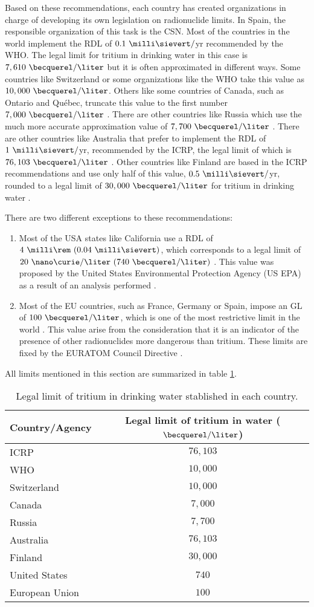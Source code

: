 Based on these recommendations, each country has created organizations in charge of developing its own legislation on radionuclide limits. In Spain, the responsible organization of this task is the CSN. Most of the countries in the world implement the RDL of $0.1~\milli\sievert/$yr recommended by the WHO. The legal limit for tritium in drinking water in this case is $7,610~\becquerel/\liter$  but it is often approximated in different ways. Some countries like Switzerland \cite{Switzerland_GL} or some organizations like the WHO \cite{WHO_GL} take this value as $10,000~\becquerel/\liter$. Others like some countries of Canada, such as Ontario and Québec, truncate this value to the first number $7,000~\becquerel/\liter$ \cite{Ontario_GL, Quebec_GL}. There are other countries like Russia which use the much more accurate approximation value of $7,700~\becquerel/\liter$ \cite{Russia_GL}. There are other countries like Australia that prefer to implement the RDL of $1~\milli\sievert/$yr, recommended by the ICRP, the legal limit of which is $76,103~\becquerel/\liter$ \cite{Australia_GL}. Other countries like Finland are based in the ICRP recommendations and use only half of this value, $0.5~\milli\sievert/$yr, rounded to a legal limit of $30,000~\becquerel/\liter$ for tritium in drinking water \cite{Finland_GL}.

There are two different exceptions to these recommendations:
\begin{enumerate}
\item{} Most of the USA states like California use a RDL of $4~\milli\rem~(0.04~\milli\sievert)$, which corresponds to a legal limit of $20~\nano\curie/\liter~(740~\becquerel/\liter)$ \cite{California_GL}. This value was proposed by the United States Environmental Protection Agency (US EPA) as a result of an analysis performed \cite{USEPA_GL}.

\item{} Most of the EU countries, such as France, Germany or Spain, impose an GL of $100~\becquerel/\liter$, which is one of the most restrictive limit in the world \cite{France_GL, Germany_GL, Spain_GL}. This value arise from the consideration that it is an indicator of the presence of other radionuclides more dangerous than tritium. These limits are fixed by the EURATOM Council Directive \cite{EURATOM_GL}. 
\end{enumerate}

All limits mentioned in this section are summarized in table \ref{tab:LegalLimitTritium}.

\begin{table}[htbp]
\centering{}%
\begin{tabular}{lc}
\toprule 
Country/Agency & Legal limit of tritium in water ($\becquerel/\liter$) \tabularnewline
\midrule
\midrule 
ICRP & $76,103$ \tabularnewline
WHO & $10,000$ \tabularnewline
Switzerland & $10,000$ \tabularnewline
Canada & $7,000$ \tabularnewline
Russia & $7,700$ \tabularnewline
Australia & $76,103$ \tabularnewline
Finland & $30,000$ \tabularnewline
United States & $740$ \tabularnewline
European Union & $100$ \tabularnewline
\bottomrule
\end{tabular}
\caption{Legal limit of tritium in drinking water stablished in each country.}
\label{tab:LegalLimitTritium}
\end{table}